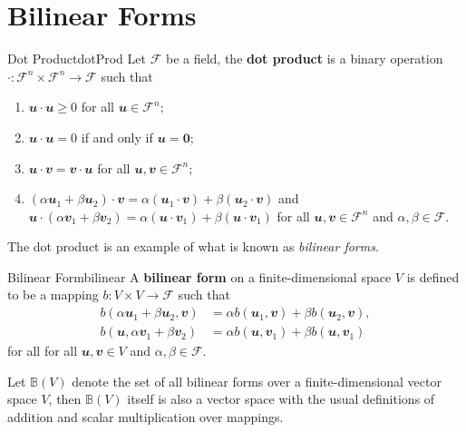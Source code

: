 \documentclass[math, code]{amznotes}
\theoremstyle{remark}
\newcommand{\zero}{\mathbf{0}}
\begin{document}
\section{Bilinear Forms}
\begin{dfnbox}{Dot Product}{dotProd}
    Let $\mathcal{F}$ be a field, the {\color{red} \textbf{dot product}} is a binary operation $\cdot \colon \mathcal{F}^n \times \mathcal{F}^n \to \mathcal{F}$ such that 
    \begin{enumerate}
        \item $\mathbfit{u} \cdot \mathbfit{u} \geq 0$ for all $\mathbfit{u} \in \mathcal{F}^n$;
        \item $\mathbfit{u} \cdot \mathbfit{u} = 0$ if and only if $\mathbfit{u} = \zero$;
        \item $\mathbfit{u} \cdot \mathbfit{v} = \mathbfit{v} \cdot \mathbfit{u}$ for all $\mathbfit{u}, \mathbfit{v} \in \mathcal{F}^n$;
        \item $(\alpha\mathbfit{u}_1 + \beta\mathbfit{u}_2) \cdot \mathbfit{v} = \alpha(\mathbfit{u}_1 \cdot \mathbfit{v}) + \beta(\mathbfit{u}_2 \cdot \mathbfit{v})$ and $\mathbfit{u} \cdot (\alpha\mathbfit{v}_1 + \beta\mathbfit{v}_2) = \alpha(\mathbfit{u} \cdot \mathbfit{v}_1) + \beta(\mathbfit{u} \cdot \mathbfit{v}_1)$ for all $\mathbfit{u}, \mathbfit{v} \in \mathcal{F}^n$ and $\alpha, \beta \in \mathcal{F}$.
    \end{enumerate}
\end{dfnbox}
The dot product is an example of what is known as \textit{bilinear forms}.
\begin{dfnbox}{Bilinear Form}{bilinear}
    A {\color{red} \textbf{bilinear form}} on a finite-dimensional space $V$ is defined to be a mapping $b \colon V \times V \to \mathcal{F}$ such that 
    \begin{align*}
        b(\alpha\mathbfit{u}_1 + \beta\mathbfit{u}_2, \mathbfit{v}) & = \alpha b(\mathbfit{u}_1, \mathbfit{v}) + \beta b(\mathbfit{u}_2, \mathbfit{v}), \\
        b(\mathbfit{u}, \alpha\mathbfit{v}_1 + \beta\mathbfit{v}_2) & = \alpha b(\mathbfit{u}, \mathbfit{v}_1) + \beta b(\mathbfit{u}, \mathbfit{v}_1)
    \end{align*}
    for all for all $\mathbfit{u}, \mathbfit{v} \in V$ and $\alpha, \beta \in \mathcal{F}$.
\end{dfnbox}
Let $\mathbb{B}(V)$ denote the set of all bilinear forms over a finite-dimensional vector space $V$, then $\mathbb{B}(V)$ itself is also a vector space with the usual definitions of addition and scalar multiplication over mappings.
\end{document}
